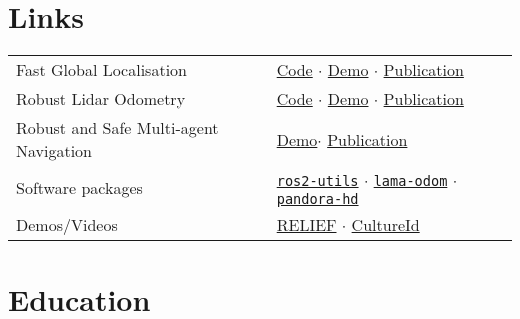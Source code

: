 \documentclass[a4paper,10pt,twoside]{article}
\begin{document}
\section{\textbf{Links}}\verticalspacebetweensectionandcontent\vspace{-1em}
\noindent\begin{center}\begin{tabular}{ll}
  Fast Global Localisation &
  \href{https://github.com/cbgl/cbgl}{Code} $\cdot$
  \href{https://www.youtube.com/watch?v=xaDKjI0WkDc}{Demo} $\cdot$
  \href{https://ieeexplore.ieee.org/abstract/document/10802235}{Publication}
  \\

  Robust Lidar Odometry &
  \href{https://github.com/fourier-scan-matcher/fsm}{Code} $\cdot$
  \href{https://www.youtube.com/watch?v=hB4qsHCEXGI}{Demo} $\cdot$
  \href{https://ieeexplore.ieee.org/abstract/document/9981228}{Publication}
  \\

  Robust and Safe Multi-agent Navigation &
  \href{https://www.youtube.com/watch?v=937OZez1iN8}{Demo}$\cdot$
  \href{https://www.tandfonline.com/doi/full/10.1080/00207179.2018.1514129}{Publication}
  \\

  Software packages &
  \href{https://github.com/li9i/ros2-utils}{\texttt{ros2-utils}} $\cdot$
  \href{https://github.com/li9i/lama-odom}{\texttt{lama-odom}} $\cdot$
  \href{https://github.com/li9i/pandora\_vision\_2014/tree/hydro-devel/pandora\_vision\_hole\_detector}{\texttt{pandora-hd}}
  \\

  Demos/Videos &
  \href{https://relief.web.auth.gr/#pg-72-1}{RELIEF} $\cdot$
  \href{https://cultureid.web.auth.gr/?page_id=200&lang=en#pl-200}{CultureId}
\end{tabular}\end{center}
\verticalspacebetweensections

\vfill

\section{\textbf{Education}}\verticalspacebetweensectionandcontent
\end{document}
